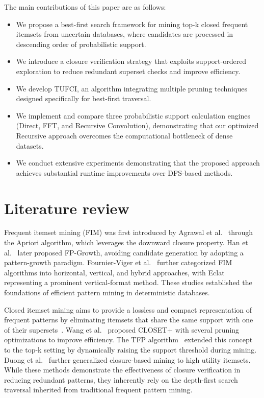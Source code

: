 \documentclass[10pt,letterpaper]{article}
\begin{document}
The main contributions of this paper are as follows:
\begin{itemize}
    \item We propose a best-first search framework for mining top-k closed
    frequent itemsets from uncertain databases, where candidates are processed
    in descending order of probabilistic support.

    \item We introduce a closure verification strategy that exploits
    support-ordered exploration to reduce redundant superset checks and improve
    efficiency.

    \item We develop TUFCI, an algorithm integrating multiple pruning
    techniques designed specifically for best-first traversal.

    \item We implement and compare three probabilistic support calculation
    engines (Direct, FFT, and Recursive Convolution), demonstrating that our
    optimized Recursive approach overcomes the computational bottleneck of
    dense datasets.

    \item We conduct extensive experiments demonstrating that the proposed
    approach achieves substantial runtime improvements over DFS-based methods.
\end{itemize}





\section*{Literature review}

Frequent itemset mining (FIM) was first introduced by Agrawal et al.~\cite{bib1} through the Apriori algorithm, which leverages the downward closure property. Han et al.~\cite{bib8} later proposed FP-Growth, avoiding candidate generation by adopting a pattern-growth paradigm. Fournier-Viger et al.~\cite{bib9} further categorized FIM algorithms into horizontal, vertical, and hybrid approaches, with Eclat~\cite{bib10} representing a prominent vertical-format method. These studies established the foundations of efficient pattern mining in deterministic databases.

Closed itemset mining aims to provide a lossless and compact representation of frequent patterns by eliminating itemsets that share the same support with one of their supersets~\cite{bib5}. Wang et al.~\cite{bib11} proposed CLOSET+ with several pruning optimizations to improve efficiency. The TFP algorithm~\cite{bib6} extended this concept to the top-k setting by dynamically raising the support threshold during mining. Duong et al.~\cite{bib12} further generalized closure-based mining to high utility itemsets. While these methods demonstrate the effectiveness of closure verification in reducing redundant patterns, they inherently rely on the depth-first search traversal inherited from traditional frequent pattern mining.
\end{document}
